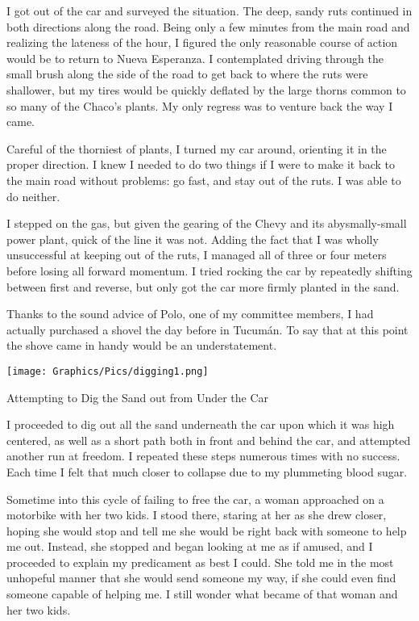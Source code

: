 I got out of the car and surveyed the situation. The deep, sandy ruts continued in both directions along the road. Being only a few minutes from the main road and realizing the lateness of the hour, I figured the only reasonable course of action would be to return to Nueva Esperanza. I contemplated driving through the small brush along the side of the road to get back to where the ruts were shallower, but my tires would be quickly deflated by the large thorns common to so many of the Chaco’s plants. My only regress was to venture back the way I came.

Careful of the thorniest of plants, I turned my car around, orienting it in the proper direction. I knew I needed to do two things if I were to make it back to the main road without problems: go fast, and stay out of the ruts. I was able to do neither.

I stepped on the gas, but given the gearing of the Chevy and its abysmally-small power plant, quick of the line it was not. Adding the fact that I was wholly unsuccessful at keeping out of the ruts, I managed all of three or four meters before losing all forward momentum. I tried rocking the car by repeatedly shifting between first and reverse, but only got the car more firmly planted in the sand.

Thanks to the sound advice of Polo, one of my committee members, I had actually purchased a shovel the day before in Tucumán. To say that at this point the shove came in handy would be an understatement.

\begin{ssfigure}
  \centering
  \texttt{[image: Graphics/Pics/digging1.png]}
  \caption{Attempting to Dig the Sand out from Under the Car}
  \label{pic:digging1}
\end{ssfigure}

I proceeded to dig out all the sand underneath the car upon which it was high centered, as well as a short path both in front and behind the car, and attempted another run at freedom. I repeated these steps numerous times with no success. Each time I felt that much closer to collapse due to my plummeting blood sugar.

Sometime into this cycle of failing to free the car, a woman approached on a motorbike with her two kids. I stood there, staring at her as she drew closer, hoping she would stop and tell me she would be right back with someone to help me out. Instead, she stopped and began looking at me as if amused, and I proceeded to explain my predicament as best I could. She told me in the most unhopeful manner that she would send someone my way, if she could even find someone capable of helping me. I still wonder what became of that woman and her two kids.

